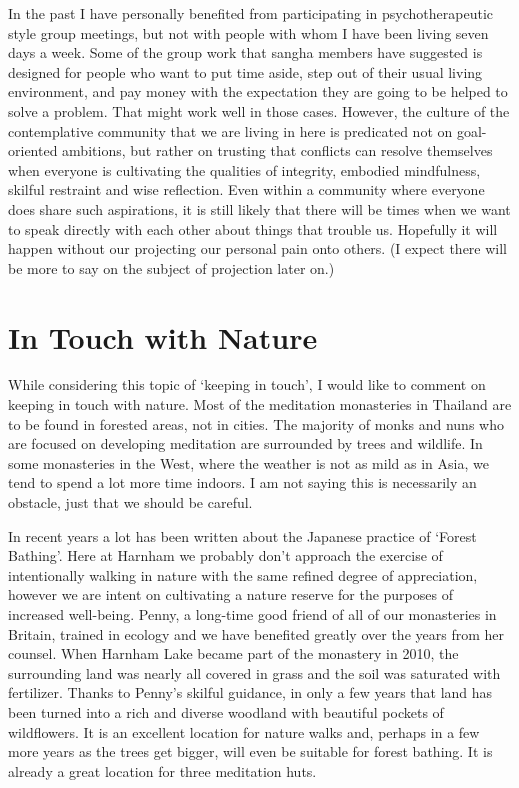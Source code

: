 In the past I have personally benefited from participating in
psychotherapeutic style group meetings, but not with people with whom I
have been living seven days a week. Some of the group work that sangha
members have suggested is designed for people who want to put time
aside, step out of their usual living environment, and pay money with
the expectation they are going to be helped to solve a problem. That
might work well in those cases. However, the culture of the
contemplative community that we are living in here is predicated not on
goal-oriented ambitions, but rather on trusting that conflicts can
resolve themselves when everyone is cultivating the qualities of integrity, embodied mindfulness, skilful restraint and wise reflection. Even within
a community where everyone does share such aspirations, it is still
likely that there will be times when we want to speak directly with each
other about things that trouble us. Hopefully it will happen without our
projecting our personal pain onto others. (I expect there will be more
to say on the subject of projection later on.)

\section{In Touch with Nature}

While considering this topic of `keeping in touch', I would like to
comment on keeping in touch with nature. Most of the meditation
monasteries in Thailand are to be found in forested areas, not in
cities. The majority of monks and nuns who are focused on developing
meditation are surrounded by trees and wildlife. In some monasteries in
the West, where the weather is not as mild as in Asia, we tend to spend
a lot more time indoors. I am not saying this is necessarily an
obstacle, just that we should be careful.

In recent years a lot has been written about the Japanese practice of `Forest
Bathing'\cite{bathing}. Here at Harnham we probably don't approach the
exercise of intentionally walking in nature with the same refined degree
of appreciation, however we are intent on cultivating a nature reserve
for the purposes of increased well-being. Penny, a long-time good friend
of all of our monasteries in Britain, trained in ecology and we have
benefited greatly over the years from her counsel. When Harnham Lake
became part of the monastery in 2010, the surrounding land was nearly
all covered in grass and the soil was saturated with fertilizer. Thanks
to Penny's skilful guidance, in only a few years that land has been
turned into a rich and diverse woodland with beautiful pockets of
wildflowers. It is an excellent location for nature walks and, perhaps
in a few more years as the trees get bigger, will even be suitable for
forest bathing. It is already a great location for three meditation
huts.

